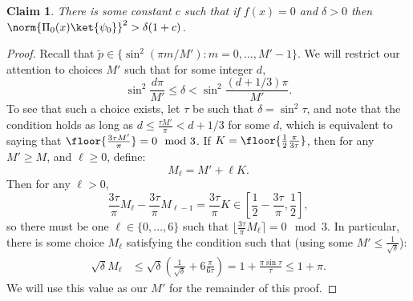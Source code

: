 \documentclass[11pt]{article}
\numberwithin{equation}{section}
\newtheorem{claim}[theorem]{Claim}
\theoremstyle{definition}
\theoremstyle{plain}
\begin{document}
\begin{claim}
There is some constant $c$ such that if $f(x)=0$ and $\delta>0$ then $\norm{\Pi_0(x)\ket{\psi_0}}^2>\delta(1+c)$. 
\end{claim}
\begin{proof}
Recall that $\tilde p\in \{\sin^2(\pi m/M'): m=0,\dots, M'-1\}$. We will restrict our attention to choices $M'$ such that for some integer $d$,
$$\sin^2\frac{d\pi}{M'}\leq \delta < \sin^2\frac{(d+1/3)\pi}{M'}.$$
To see that such a choice exists, let ${\tau}$ be such that $\delta=\sin^2\tau$, and note that the condition holds as long as $d\leq \frac{\tau M'}{\pi}< d+1/3$ for some $d$, which is equivalent to saying that $\floor{\frac{3\tau M'}{\pi}} = 0\mod 3$. If $K=\floor{\frac{1}{2}\frac{\pi}{3\tau}}$, then for any $M'\geq M$, and $\ell\geq 0$, define:
$$M_{\ell} = M'+\ell K.$$
Then for any $\ell>0$, 
$$\frac{3\tau}{\pi}M_{\ell} - \frac{3\tau}{\pi}M_{\ell-1} = \frac{3\tau}{\pi}K\in \left[\frac{1}{2}-\frac{3\tau}{\pi},\frac{1}{2}\right],$$
so there must be one $\ell\in \{0,\dots,6\}$ such that $\lfloor \frac{3\tau}{\pi}M_{\ell} \rceil = 0\mod 3$. 
In particular, there is some choice $M_\ell$ satisfying the condition such that (using some $M'\leq \frac{1}{\sqrt{\delta}}$):
\begin{align}
\sqrt{\delta} M_{\ell} &\leq \sqrt{\delta}\left(\frac{1}{\sqrt{\delta}}+6\frac{\pi}{6\tau}\right)
= 1+\frac{\pi\sin\tau}{\tau}
\leq 1+\pi.\label{eq:M-ell}
\end{align}
We will use this value as our $M'$ for the remainder of this proof. 


\end{proof}
\end{document}
